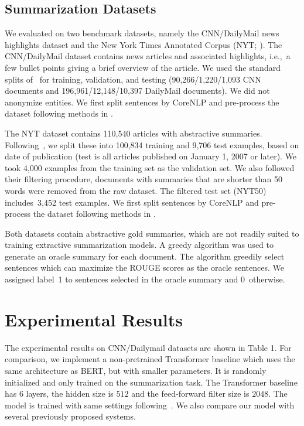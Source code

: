 \documentclass[11pt,a4paper]{article}
\begin{document}
    \subsection{Summarization Datasets}
    We evaluated  on two benchmark datasets, namely the
    CNN/DailyMail news highlights dataset \cite{hermann2015teaching} and
    the New York Times Annotated Corpus (NYT; \citealt{nytcorpus}).
    The CNN/DailyMail dataset contains news articles and associated
    highlights, i.e.,~a few bullet points giving a brief overview of the
    article.  We used the standard splits of~\citet{hermann2015teaching}
    for training, validation, and testing (90,266/1,220/1,093 CNN
    documents and 196,961/12,148/10,397 DailyMail documents). We did not
    anonymize entities.
    We first split sentences by CoreNLP and pre-process the dataset following methods in \citet{see-acl17}.

    
    
    The NYT dataset contains 110,540 articles with abstractive
    summaries. Following~\citet{durrett2016learning}, we split these into
    100,834 training and 9,706 test examples, based on date of publication
    (test is all articles published on January 1, 2007 or later).  
    We took 4,000 examples from the training set as the validation set.
    We also
    followed their filtering procedure, documents  with summaries that
    are shorter than 50 words were removed from the raw dataset.  The
    filtered test set (NYT50) includes~3,452 test examples.
        We first split sentences by CoreNLP and pre-process the dataset following methods in \citet{durrett2016learning}.
    
    
    Both datasets contain abstractive gold summaries, which are not
    readily suited to training extractive summarization models. A greedy
    algorithm was used to
    generate an oracle summary for each document. The algorithm
    greedily select sentences which can maximize the ROUGE scores as the oracle sentences.
 We assigned label~1 to sentences selected in the oracle
    summary and 0~otherwise.
    



    
    
    
    \section{Experimental Results}
    The experimental results on CNN/Dailymail datasets are shown in Table 1.
            For comparison, we implement a non-pretrained Transformer baseline which uses the same architecture as BERT, but with smaller parameters. It is randomly initialized and only trained on the summarization task. The Transformer baseline has 6 layers, the hidden size is $512$ and the feed-forward filter size is $2048$. The model is trained with same settings following~\citet{vaswani2017attention}.   
    We also compare our model with several previously proposed systems.        
\end{document}
